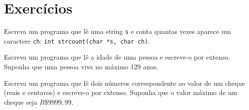 \section{Exercícios}
\begin{exer}Escreva um programa que lê uma string \verb|s| e conta quantas vezes aparece um caractere \verb|ch|: \verb|int strcount(char *s, char ch)|.
\end{exer}
\begin{exer}Escreva um programa que lê a idade de uma pessoa e escreve-o por extenso. Suponha que uma pessoa viva no máximo 129 anos. 
\end{exer}
\begin{exer}Escreva um programa que lê dois números correspondente ao valor de um cheque (reais e centavos) e escreve-o por extenso. Suponha que o valor máximo de um cheque seja $R\$9999,99$. 
\end{exer}